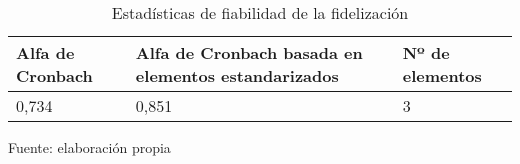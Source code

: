 \begin{table}[h]
    \caption {Estadísticas de fiabilidad de la fidelización}
	\label{tab:fiabilidadFidelizacion}
	\setlength\extrarowheight{5pt}
	
	\begin{tabular}{p{5.7cm} p{4.6cm} p{2.8cm}}
	\toprule
	Alfa de Cronbach	& Alfa de Cronbach basada en elementos estandarizados	& Nº de elementos \\
	\midrule
	0,734				& 0,851					& 3 \\
	\bottomrule
	\end{tabular}
	
	\center
	\footnotesize
	Fuente: elaboración propia
\end{table}
